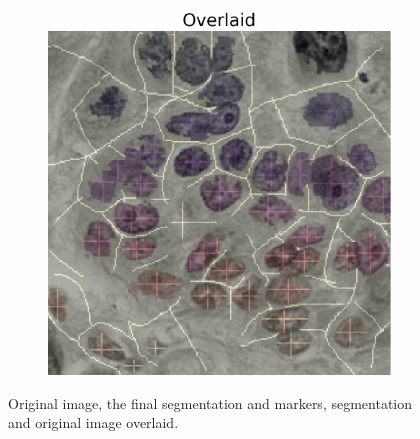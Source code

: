 \begin{figure}
\begin{subfigure}{0.32\linewidth}
	\end{subfigure}
	\hfill
	\begin{subfigure}{0.32\linewidth}
		\centering
		\includegraphics[width=\linewidth]{Materials/cellOverlaid}
	\end{subfigure}
	\caption{Original image, the final segmentation and markers, segmentation and original image overlaid.}
	\label{cellSeg}
\end{figure}

